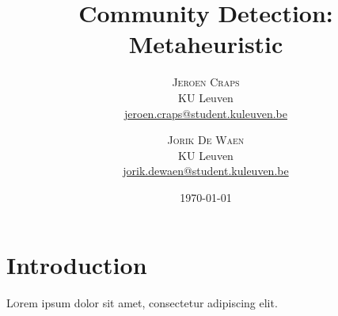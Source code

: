 \documentclass[twoside,twocolumn]{article}
\title{Community Detection: Metaheuristic} %
\author{%
\textsc{Jeroen Craps} \\[1ex] %
\normalsize KU Leuven \\ %
\normalsize \href{mailto:jeroen.craps@student.kuleuven.be}{jeroen.craps@student.kuleuven.be} %
\and %
\textsc{Jorik De Waen} \\[1ex] %
\normalsize KU Leuven \\ %
\normalsize \href{mailto:jorik.dewaen@student.kuleuven.be}{jorik.dewaen@student.kuleuven.be} %
}
\date{\today} %
\begin{document}
\maketitle


\section{Introduction}

\lettrine[nindent=0em,lines=3]{L} orem ipsum dolor sit amet, consectetur adipiscing elit.

\end{document}

